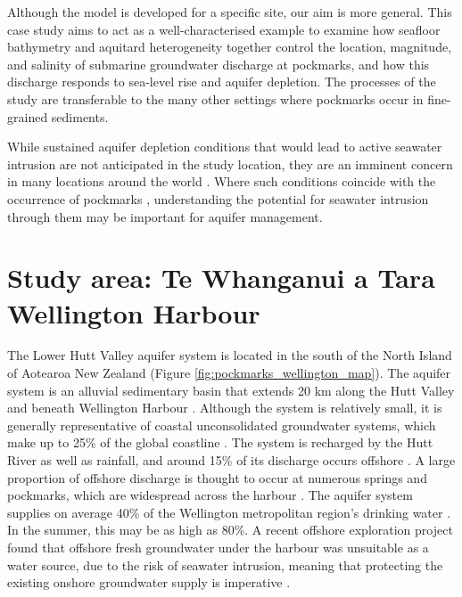 \documentclass[draft, 10pt]{agujournal2019}
\begin{document}
Although the model is developed for a specific site, our aim is more general.
This case study aims to act as a well-characterised example to examine how seafloor bathymetry and aquitard heterogeneity together control the location, magnitude, and salinity of submarine groundwater discharge at pockmarks,
and how this discharge responds to sea-level rise and aquifer depletion.
The processes of the study are transferable to the many other settings where pockmarks occur in fine-grained sediments.

While sustained aquifer depletion conditions that would lead to active seawater intrusion are not anticipated in the study location,
they are an imminent concern in many locations around the world \cite{michael_science_2017, ferguson_vulnerability_2012, zamrsky_global_2024}.
Where such conditions coincide with the occurrence of pockmarks \cite{mendecki_saltwater_2025},
understanding the potential for seawater intrusion through them may be important for aquifer management.

\section{Study area: Te Whanganui a Tara Wellington Harbour}

The Lower Hutt Valley aquifer system is located in the south of the North Island of Aotearoa New Zealand (Figure \ref{fig:pockmarks_wellington_map}).
The aquifer system is an alluvial sedimentary basin that extends 20 km along the Hutt Valley and beneath Wellington Harbour \cite{begg_revised_2023}.
Although the system is relatively small, it is generally representative of coastal unconsolidated groundwater systems,
which make up to 25\% of the global coastline \cite{zamrsky_geological_2020, zamrsky_global_2024}.
The system is recharged by the Hutt River as well as rainfall, and around 15\% of its discharge occurs offshore \cite{bennett_hutt_2024}.
A large proportion of offshore discharge is thought to occur at numerous springs and pockmarks, which are widespread across the harbour \cite{hoffmann_fresh_2023, harding_characteristics_2000}.
The aquifer system supplies on average 40\% of the Wellington metropolitan region's drinking water \cite{begg_revised_2023}.
In the summer, this may be as high as 80\%. A recent offshore exploration project found that offshore fresh groundwater under the harbour was unsuitable as a water source,
due to the risk of seawater intrusion, meaning that protecting the existing onshore groundwater supply is imperative \cite{gyopari_wellington_2018, morgan_likelihood_2022}.
\end{document}
